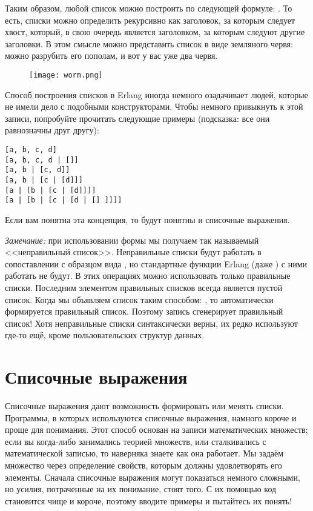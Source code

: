 Таким образом, любой список можно построить по следующей формуле: .
То есть, списки можно определить рекурсивно как заголовок, за которым следует хвост, который, в свою очередь является заголовком, за которым следуют другие заголовки.
В этом смысле можно представить список в виде земляного червя: можно разрубить его пополам, и вот у вас уже два червя.

\begin{figure}[h!]
    \centering
    \texttt{[image: worm.png]}
\end{figure} 

Способ построения списков в Erlang иногда немного озадачивает людей, которые не имели дело с подобными конструкторами.
Чтобы немного привыкнуть к этой записи, попробуйте прочитать следующие примеры (подсказка: все они равнозначны друг другу):\\ 
\begin{lstlisting}[style=repl]
[a, b, c, d]
[a, b, c, d | []]
[a, b | [c, d]]
[a, b | [c | [d]]]
[a | [b | [c | [d]]]]
[a | [b | [c | [d | [] ]]]]
\end{lstlisting}

Если вам понятна эта концепция, то будут понятны и списочные выражения.\\ 
\colorbox{lgray}
{
    \begin{minipage}{1.0\linewidth}
        \emph{Замечание:} при использовании формы \ops{[1 | 2]} мы получаем так называемый <<неправильный список>>.
        Неправильные списки будут работать в сопоставлении с образцом вида , но стандартные функции Erlang (даже ) с ними работать не будут.
        В этих операциях можно использовать только правильные списки.
        Последним элементом правильных списков всегда является пустой список.
        Когда мы объявляем список таким способом: \ops{[2]}, то автоматически формируется правильный список.
        Поэтому запись \ops{[1|[2]]} сгенерирует правильный список!
        Хотя неправильные списки синтаксически верны, их редко используют где\--то ещё, кроме пользовательских структур данных.
    \end{minipage}
}
\section{Списочные выражения}
Списочные выражения дают возможность формировать или менять списки.
Программы, в которых используются списочные выражения, намного короче и проще для понимания.
Этот способ основан на записи математических множеств; если вы когда\--либо занимались теорией множеств, или сталкивались с математической записью, то наверняка знаете как она работает.
Мы задаём множество через определение свойств, которым должны удовлетворять его элементы.
Сначала списочные выражения могут показаться немного сложными, но усилия, потраченные на их понимание, стоят того.
С их помощью код становится чище и короче, поэтому вводите примеры и пытайтесь их понять!

